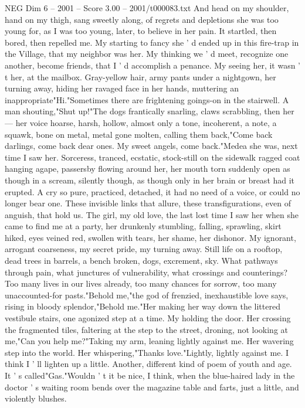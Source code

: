 \begin{textsample}{NEG Dim 6 – 2001 – Score 3.00 – 2001/t000083.txt}
And head on my shoulder, hand on my thigh, sang sweetly along, of regrets and depletions she was too young for, as I was too young, later, to believe in her pain.
It startled, then bored, then repelled me.
My starting to fancy she ' d ended up in this fire-trap in the Village, that my neighbor was her.
My thinking we ' d meet, recognize one another, become friends, that I ' d accomplish a penance.
My seeing her, it wasn ' t her, at the mailbox.
Gray-yellow hair, army pants under a nightgown, her turning away, hiding her ravaged face in her hands, muttering an inappropriate"Hi."Sometimes there are frightening goings-on in the stairwell.
A man shouting,"Shut up!"The dogs frantically snarling, claws scrabbling, then her — her voice hoarse, harsh, hollow, almost only a tone, incoherent, a note, a squawk, bone on metal, metal gone molten, calling them back,"Come back darlings, come back dear ones.
My sweet angels, come back."Medea she was, next time I saw her.
Sorceress, tranced, ecstatic, stock-still on the sidewalk ragged coat hanging agape, passersby flowing around her, her mouth torn suddenly open as though in a scream, silently though, as though only in her brain or breast had it erupted.
A cry so pure, practiced, detached, it had no need of a voice, or could no longer bear one.
These invisible links that allure, these transfigurations, even of anguish, that hold us.
The girl, my old love, the last lost time I saw her when she came to find me at a party, her drunkenly stumbling, falling, sprawling, skirt hiked, eyes veined red, swollen with tears, her shame, her dishonor.
My ignorant, arrogant coarseness, my secret pride, my turning away.
Still life on a rooftop, dead trees in barrels, a bench broken, dogs, excrement, sky.
What pathways through pain, what junctures of vulnerability, what crossings and counterings?
Too many lives in our lives already, too many chances for sorrow, too many unaccounted-for pasts."Behold me,"the god of frenzied, inexhaustible love says, rising in bloody splendor,"Behold me."Her making her way down the littered vestibule stairs, one agonized step at a time.
My holding the door.
Her crossing the fragmented tiles, faltering at the step to the street, droning, not looking at me,"Can you help me?"Taking my arm, leaning lightly against me.
Her wavering step into the world.
Her whispering,"Thanks love."Lightly, lightly against me.
I think I ' ll lighten up a little.
Another, different kind of poem of youth and age.
It ' s called"Gas."Wouldn ' t it be nice, I think, when the blue-haired lady in the doctor ' s waiting room bends over the magazine table and farts, just a little, and violently blushes.

\end{textsample}
